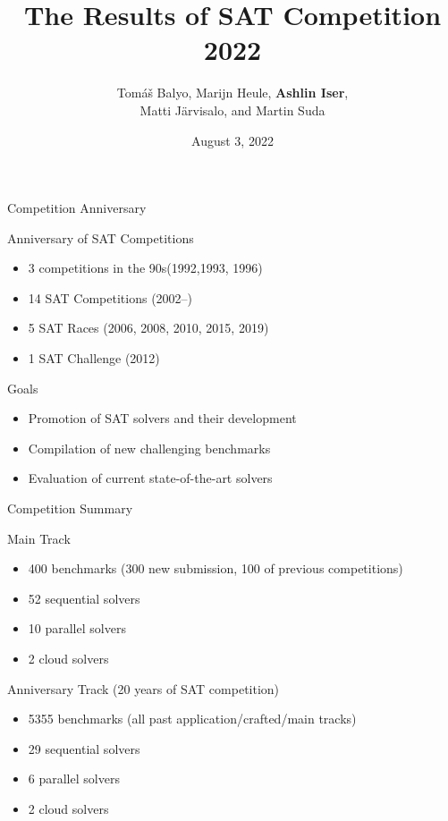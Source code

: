 \documentclass{beamer}
\title[SAT Competition 2022]{The Results of SAT Competition 2022}
\author[Balyo, Heule, Iser, J\"{a}rvisalo, Suda] {Tom{\'a}{\v s} Balyo, Marijn Heule,
{\bf Ashlin Iser},\\ Matti J\"{a}rvisalo, and Martin Suda}
\institute[] %
{
SAT 2022 Conference, Haifa (Israel) \\ %
}
\date{August 3, 2022} %
\begin{document}
\begin{frame}
\titlepage %
\end{frame}

\begin{frame}{Competition Anniversary}

\begin{block}{Anniversary of SAT Competitions}
\begin{itemize}
\item 3 competitions in the 90s\hfill (1992,1993, 1996)
\item 14 SAT Competitions \hfill (2002--)
\item 5 SAT Races \hfill (2006, 2008, 2010, 2015, 2019)
\item 1 SAT Challenge \hfill (2012)
\end{itemize}
\end{block}

\bigskip

\begin{block}{Goals}
\begin{itemize}
\item Promotion of SAT solvers and their development
\item Compilation of new challenging benchmarks
\item Evaluation of current state-of-the-art solvers
\end{itemize}
\end{block}

\end{frame}


\begin{frame}{Competition Summary}
\begin{block}{Main Track}
\begin{itemize}
  \item 400 benchmarks (300 new submission, 100 of previous competitions)
  \item 52 sequential solvers
  \item 10 parallel solvers
  \item 2 cloud solvers
\end{itemize}
\end{block}

\begin{block}{Anniversary Track (20 years of SAT competition)}
\begin{itemize}
  \item 5355 benchmarks (all past application/crafted/main tracks)
  \item 29 sequential solvers
  \item 6 parallel solvers
  \item 2 cloud solvers
\end{itemize}
\end{block}
\end{frame}
\end{document}
